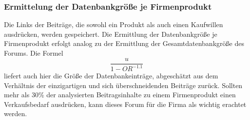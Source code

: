 \subsubsection{Ermittelung der Datenbankgröße je Firmenprodukt}
Die Links der Beiträge, die sowohl ein Produkt als auch einen Kaufwillen ausdrücken, werden gespeichert. Die Ermittlung der Datenbankgröße je Firmenprodukt erfolgt analog zu der Ermittlung der Gesamtdatenbankgröße des Forums. Die Formel \[\frac{u}{1-OR^{-1.1}}\] \cite{lu2008efficient} liefert auch hier die Größe der Datenbankeinträge, abgeschätzt aus dem Verhältnis der einzigartigen und sich überschneidenden Beiträge zurück.
Sollten mehr als 30\% der analysierten Beitragsinhalte zu einem Firmenprodukt einen Verkaufsbedarf ausdrücken, kann dieses Forum für die Firma als wichtig erachtet werden.
